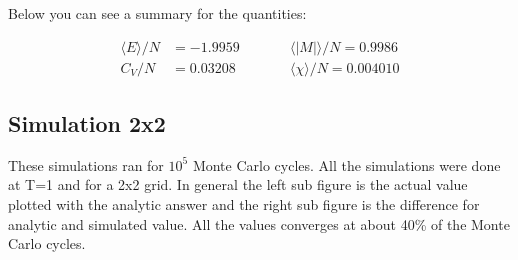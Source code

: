Below you can see a summary for the quantities:

\begin{align*}
    \langle E \rangle /N &= -1.9959  \qquad &&\langle |M| \rangle /N = 0.9986
    \\
    C_V/N &= 0.03208  \qquad &&\langle \chi \rangle / N = 0.004010
\end{align*}
























\pagebreak
\subsection{Simulation 2x2}

These simulations ran for $10^5$ Monte Carlo cycles. All the simulations were done at T=1 and for a 2x2 grid. In general the left sub figure is the actual value plotted with the analytic answer and the right sub figure is the difference for analytic and simulated value.
All the values converges at about 40\% of the Monte Carlo cycles.

